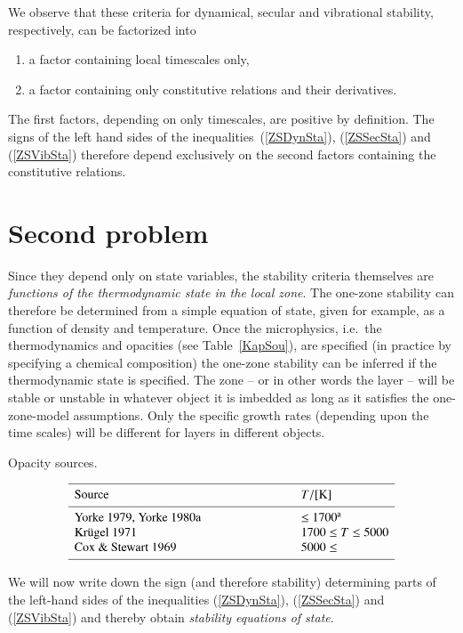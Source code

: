 \documentclass{layout}
\begin{document}
   We observe that these criteria for dynamical, secular and
   vibrational stability, respectively, can be factorized into
   \begin{enumerate}
      \item a factor containing local timescales only,
      \item a factor containing only constitutive relations and
         their derivatives.
   \end{enumerate}
   The first factors, depending on only timescales, are positive
   by definition. The signs of the left hand sides of the
   inequalities~(\ref{ZSDynSta}), (\ref{ZSSecSta}) and (\ref{ZSVibSta})
   therefore depend exclusively on the second factors containing
   the constitutive relations. 

\section{Second problem}

   Since they depend only
   on state variables, the stability criteria themselves are \emph{
   functions of the thermodynamic state in the local zone}. The
   one-zone stability can therefore be determined
   from a simple equation of state, given for example, as a function
   of density and
   temperature. Once the microphysics, i.e.\ the thermodynamics
   and opacities (see Table~\ref{KapSou}), are specified (in practice
   by specifying a chemical composition) the one-zone stability can
   be inferred if the thermodynamic state is specified.
   The zone -- or in
   other words the layer -- will be stable or unstable in
   whatever object it is imbedded as long as it satisfies the
   one-zone-model assumptions. Only the specific growth rates
   (depending upon the time scales) will be different for layers
   in different objects.

   \begin{table}
      \caption[]{Opacity sources.}
         \label{KapSou}
     $$ 
         \begin{array}{p{0.5\linewidth}l}
            \hline
            \noalign{\smallskip}
            Source      &  T / {[\mathrm{K}]} \\
            \noalign{\smallskip}
            \hline
            \noalign{\smallskip}
            Yorke 1979, Yorke 1980a & \leq 1700^{\mathrm{a}}     \\
            Kr\"ugel 1971           & 1700 \leq T \leq 5000 \\
            Cox \& Stewart 1969     & 5000 \leq             \\
            \noalign{\smallskip}
            \hline
         \end{array}
     $$ 
   \end{table}
%
   We will now write down the sign (and therefore stability)
   determining parts of the left-hand sides of the inequalities
   (\ref{ZSDynSta}), (\ref{ZSSecSta}) and (\ref{ZSVibSta}) and thereby
   obtain \emph{stability equations of state}.
\end{document}
